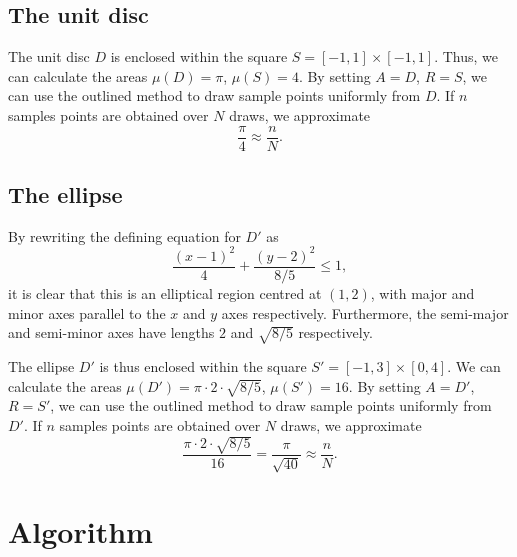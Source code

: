 \documentclass[10pt]{article}
\begin{document}
    \subsection{The unit disc}

    The unit disc $D$ is enclosed within the square $S = [-1, 1] \times [-1, 1]$.
    Thus, we can calculate the areas $\mu(D) = \pi$, $\mu(S) = 4$. By setting $A =
    D$, $R = S$, we can use the outlined method to draw sample points uniformly from
    $D$. If $n$ samples points are obtained over $N$ draws, we approximate \[
        \frac{\pi}{4} \approx \frac{n}{N}.
    \] 


    \subsection{The ellipse}
    
    By rewriting the defining equation for $D'$ as \[
        \frac{(x - 1)^2}{4} + \frac{(y - 2)^2}{8 / 5} \leq 1,
    \] it is clear that this is an elliptical region centred at $(1, 2)$, with major
    and minor axes parallel to the $x$ and $y$ axes respectively. Furthermore, the
    semi-major and semi-minor axes have lengths $2$ and $\sqrt{8 / 5}$ respectively.

    The ellipse $D'$ is thus enclosed within the square $S' = [-1, 3] \times [0, 4]$.
    We can calculate the areas $\mu(D') = \pi\cdot 2 \cdot \sqrt{8 / 5}$, $\mu(S') =
    16$. By setting $A = D'$, $R = S'$, we can use the outlined method to draw sample
    points uniformly from $D'$. If $n$ samples points are obtained over $N$ draws, we
    approximate \[
        \frac{\pi\cdot 2 \cdot \sqrt{8 / 5}}{16} = \frac{\pi}{\sqrt{40}} \approx
        \frac{n}{N}.
    \] 


    \section{Algorithm}
    
\end{document}
